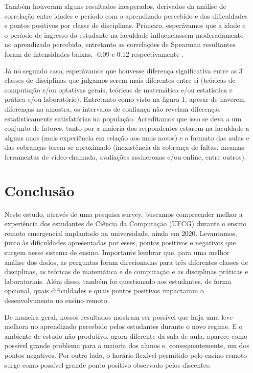 \documentclass[
  12pt,
  portuguese,
]{article}
\begin{document}
Também houveram alguns resultados inesperados, derivados da análise de
correlação entre idades e período com o aprendizado percebido e das
dificuldades e pontos positivos por classe de disciplinas. Primeiro,
esperávamos que a idade e o período de ingresso do estudante na
faculdade influenciassem moderadamente no aprendizado percebido,
entretanto as correlações de Spearman resultantes foram de intensidades
baixas, -0.09 e 0.12 respectivamente .

Já no segundo caso, esperávamos que houvesse diferença significativa
entre as 3 classes de disciplinas que julgamos serem mais diferentes
entre si (teóricas de computação e/ou optativas gerais, teóricas de
matemática e/ou estatística e prática e/ou laboratório). Entretanto como
visto na figura 1, apesar de haverem diferenças na amostra, os
intervalos de confiança não revelam diferenças estatisticamente
satisfatórias na população. Acreditamos que isso se deva a um conjunto
de fatores, tanto por a maioria dos respondentes estarem na faculdade a
alguns anos (mais experiência em relação aos mais novos) e o formato das
aulas e das cobranças terem se aproximado (inexistência da cobrança de
faltas, mesmas ferramentas de vídeo-chamada, avaliações assíncronas e/ou
online, entre outros).

\hypertarget{conclusuxe3o}{%
\section{Conclusão}\label{conclusuxe3o}}

Neste estudo, através de uma pesquisa survey, buscamos compreender
melhor a experiência dos estudantes de Ciência da Computação (UFCG)
durante o ensino remoto emergencial implantado na universidade, ainda em
2020. Levantamos, junto às dificuldades apresentadas por esses, pontos
positivos e negativos que surgem nesse sistema de ensino. Importante
lembrar que, para uma melhor análise dos dados, as perguntas foram
direcionadas para três diferentes classes de disciplinas, as teóricas de
matemática e de computação e as disciplinas práticas e laboratoriais.
Além disso, também foi questionado aos estudantes, de forma opcional,
quais dificuldades e quais pontos positivos impactaram o desenvolvimento
no ensino remoto.

De maneira geral, nossos resultados mostram ser possível que haja uma
leve melhora no aprendizado percebido pelos estudantes durante o novo
regime. E o ambiente de estudo não produtivo, agora diferente da sala de
aula, aparece como possível grande problema para a maioria dos alunos e,
consequentemente, um dos pontos negativos. Por outro lado, o horário
flexível permitido pelo ensino remoto surge como possível grande ponto
positivo observado pelos discentes.
\end{document}

